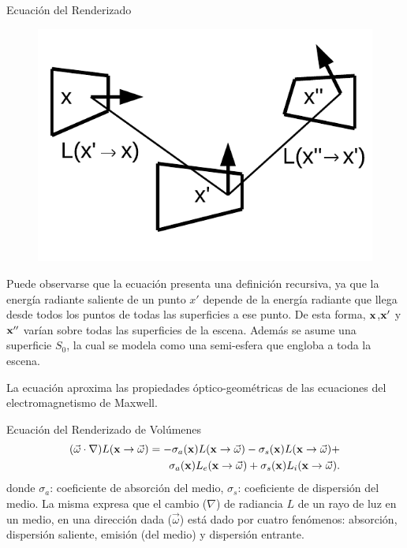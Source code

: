 \documentclass[spanish]{beamer}
\begin{document}
\begin{frame}{Ecuación del Renderizado}
\begin{figure}
\includegraphics[scale = 0.6]{../figures/rendequation}
\end{figure}

Puede observarse que la ecuación presenta una definición recursiva, ya que la energía radiante saliente de un punto $x'$ depende de la energía radiante que llega desde todos los puntos de todas las superficies a ese punto.
De esta forma, $\bold{x}$,$\bold{x'}$ y $\bold{x''}$ varían sobre todas las superficies de la escena.
Además se asume una superficie $S_{0}$, la cual se modela como una semi-esfera que engloba a toda la escena.

La ecuación aproxima las propiedades óptico-geométricas de las ecuaciones del electromagnetismo de Maxwell.
\end{frame}


\begin{frame}{Ecuación del Renderizado de Volúmenes}
\begin{equation*}
\begin{aligned}
(\vec{\omega} \cdot \nabla) L(\bold{x} \rightarrow \vec{\omega}) = - \sigma_{a}(\bold{x}) L(\bold{x} \rightarrow \vec{\omega}) - \sigma_{s}(\bold{x}) L(\bold{x} \rightarrow \vec{\omega}) + \\
\sigma_{a}(\bold{x}) L_{e}(\bold{x} \rightarrow \vec{\omega}) + \sigma_{s}(\bold{x}) L_{i}(\bold{x} \rightarrow \vec{\omega}).
\end{aligned}
\end{equation*}
donde $\sigma_{a}$: coeficiente de absorción del medio, $\sigma_{s}$: coeficiente de dispersión del medio.
La misma expresa que el cambio ($\nabla$) de radiancia $L$ de un rayo de luz en un medio, en una dirección dada ($\vec{\omega}$) está dado por cuatro fenómenos: absorción, dispersión saliente, emisión (del medio) y dispersión entrante.
\end{frame}
\end{document}
